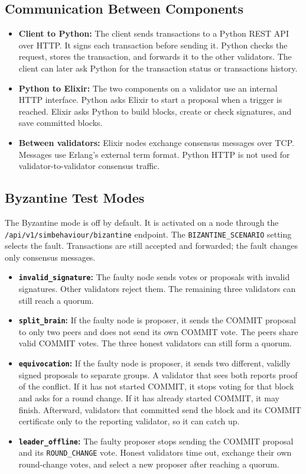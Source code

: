 \documentclass[11pt, a4paper, oneside]{memoir}
\begin{document}
\subsection{Communication Between Components}
\begin{itemize}
    \item \textbf{Client to Python:} The client sends transactions to a Python
    REST API over HTTP. It signs each transaction before sending it. Python
    checks the request, stores the transaction, and forwards it to the other
    validators. The client can later ask Python for the transaction status or transactions history.
    \item \textbf{Python to Elixir:} The two components on a validator use an
    internal HTTP interface. Python asks Elixir to start a proposal when a
    trigger is reached. Elixir asks Python to build blocks, create or check
    signatures, and save committed blocks.
    \item \textbf{Between validators:} Elixir nodes exchange consensus messages
    over TCP. Messages use Erlang's external term format. Python HTTP is not
    used for validator-to-validator consensus traffic.
\end{itemize}

\subsection{Byzantine Test Modes}
The Byzantine mode is off by default. It is activated on a node through the
\texttt{/api/v1/simbehaviour/bizantine} endpoint. The
\texttt{BIZANTINE\_SCENARIO} setting selects the fault. Transactions are still
accepted and forwarded; the fault changes only consensus messages.

\begin{itemize}
    \item \textbf{\texttt{invalid\_signature}:} The faulty node sends votes or
    proposals with invalid signatures. Other validators reject them. The
    remaining three validators can still reach a quorum.
    \item \textbf{\texttt{split\_brain}:} If the faulty node is proposer, it
    sends the COMMIT proposal to only two peers and does not send its own
    COMMIT vote. The peers share valid COMMIT votes. The three honest
    validators can still form a quorum.
    \item \textbf{\texttt{equivocation}:} If the faulty node is proposer, it
    sends two different, validly signed proposals to separate groups. A
    validator that sees both reports proof of the conflict. If it has not
    started COMMIT, it stops voting for that block and asks for a round change.
    If it has already started COMMIT, it may finish. Afterward, validators
    that committed send the block and its COMMIT certificate only to the
    reporting validator, so it can catch up.
    \item \textbf{\texttt{leader\_offline}:} The faulty proposer stops sending
    the COMMIT proposal and its \texttt{ROUND\_CHANGE} vote. Honest validators
    time out, exchange their own round-change votes, and select a new proposer
    after reaching a quorum.
\end{itemize}
\end{document}
